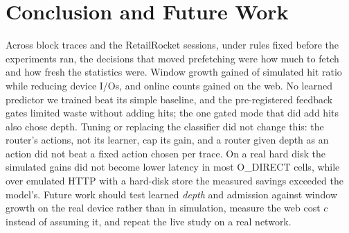 
\section{Conclusion and Future Work}\label{sec:conclusion}

Across \diskTraces{} block traces and the RetailRocket sessions, under rules
fixed before the experiments ran, the decisions that moved prefetching were
how much to fetch and how fresh the statistics were. Window growth gained
\decDiskPFourLinuxRaAtTwoHundredFiftySixAssumedOneMiBPaired{} of simulated hit
ratio while reducing device I/Os, and online counts gained
\decWebWFourHitFreshnessCI{} on the web. No learned predictor we trained beat
its simple baseline, and the pre-registered feedback gates limited waste
without adding hits; the one gated mode that did add hits also chose depth. Tuning or replacing the
classifier did not change this: the router's actions, not its learner, cap
its gain, and a router given depth as an action did not beat a fixed action
chosen per trace. On a real hard disk the simulated gains did not become lower latency
in most O\_DIRECT cells, while over emulated HTTP with a hard-disk store the
measured savings exceeded the model's. Future work should
test learned \emph{depth} and admission against window growth on the real
device rather than in simulation, measure the web cost $c$ instead of assuming
it, and repeat the live study on a real network.
